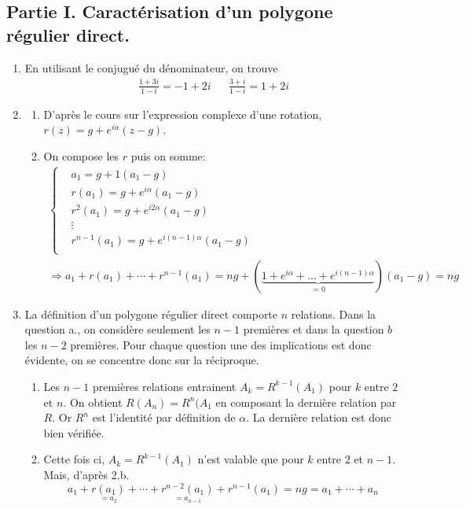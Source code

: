 \subsection*{Partie I. Caractérisation d'un polygone régulier direct.}
\begin{enumerate}
 \item En utilisant le conjugué du dénominateur, on trouve
\begin{align*}
 \frac{1+3i}{1-i}= -1+2i & & \frac{3+i}{1-i}= 1+2i  
\end{align*}
\item
\begin{enumerate}
\item D'après le cours sur l'expression complexe d'une rotation, $r(z)=g+e^{i\alpha}(z-g)$.
\item On compose les $r$ puis on somme:
\begin{multline*}
 \left\lbrace 
\begin{aligned}
 & a_1 = g +1(a_1-g)\\
 &r(a_1) = g + e^{i\alpha}(a_1-g)\\
 &r^2(a_1) = g + e^{i2\alpha}(a_1-g)\\
 &\vdots   \\
 &r^{n-1}(a_1) = g + e^{i(n-1)\alpha}(a_1-g)\\
\end{aligned}
\right. \\
\Rightarrow
a_1+r(a_1)+\cdots+r^{n-1}(a_1) 
= ng + (\underset{=0}{\underbrace{1+e^{i\alpha}+\dots+e^{i(n-1)\alpha}}})(a_1-g)
= ng
\end{multline*}
\end{enumerate}
\item La définition d'un polygone régulier direct comporte $n$ relations. Dans la question a., on considère seulement les $n-1$ premières et dans la question $b$ les $n-2$ premières. Pour chaque question une des implications est donc évidente, on se concentre donc sur la réciproque.
\begin{enumerate}
 \item Les $n-1$ premières relations entrainent $A_k=R^{k-1}(A_1)$ pour $k$ entre $2$ et $n$. On obtient $R(A_n)=R^n(A_1$ en composant la dernière relation par $R$. Or $R^n$ est l'identité par définition de $\alpha$. La dernière relation est donc bien vérifiée.
 \item Cette fois ci, $A_k=R^{k-1}(A_1)$ n'est valable que pour $k$ entre $2$ et $n-1$. Mais, d'après 2.b.
\begin{displaymath}
 a_1 + \underset{=a_2}{r(a_1)}+\cdots+\underset{=a_{n-1}}{r^{n-2}(a_1)}+r^{n-1}(a_1)=ng= a_1+\cdots +a_n

\end{displaymath}
\end{enumerate}
\end{enumerate}
